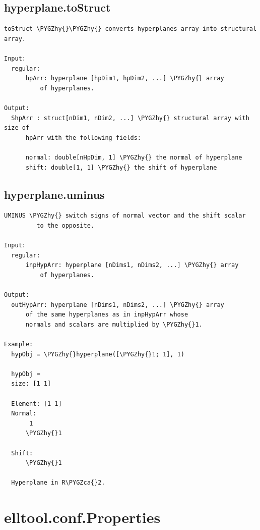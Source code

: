 \documentclass[letterpaper,10pt,english]{sphinxmanual}
\def\PYGZca{\char`\^}
\def\PYGZhy{\char`\-}
\begin{document}
\subsection{hyperplane.toStruct}
\label{chap_functions:hyperplane-tostruct}
\begin{Verbatim}[commandchars=\\\{\}]
toStruct \PYGZhy{}\PYGZhy{} converts hyperplanes array into structural array.

Input:
  regular:
      hpArr: hyperplane [hpDim1, hpDim2, ...] \PYGZhy{} array
          of hyperplanes.

Output:
  ShpArr : struct[nDim1, nDim2, ...] \PYGZhy{} structural array with size of
      hpArr with the following fields:

      normal: double[nHpDim, 1] \PYGZhy{} the normal of hyperplane
      shift: double[1, 1] \PYGZhy{} the shift of hyperplane
\end{Verbatim}


\subsection{hyperplane.uminus}
\label{chap_functions:hyperplane-uminus}
\begin{Verbatim}[commandchars=\\\{\}]
UMINUS \PYGZhy{} switch signs of normal vector and the shift scalar
         to the opposite.

Input:
  regular:
      inpHypArr: hyperplane [nDims1, nDims2, ...] \PYGZhy{} array
          of hyperplanes.

Output:
  outHypArr: hyperplane [nDims1, nDims2, ...] \PYGZhy{} array
      of the same hyperplanes as in inpHypArr whose
      normals and scalars are multiplied by \PYGZhy{}1.

Example:
  hypObj = \PYGZhy{}hyperplane([\PYGZhy{}1; 1], 1)

  hypObj =
  size: [1 1]

  Element: [1 1]
  Normal:
       1
      \PYGZhy{}1

  Shift:
      \PYGZhy{}1

  Hyperplane in R\PYGZca{}2.
\end{Verbatim}


\section{elltool.conf.Properties}
\label{chap_functions:elltool-conf-properties}
\end{document}
